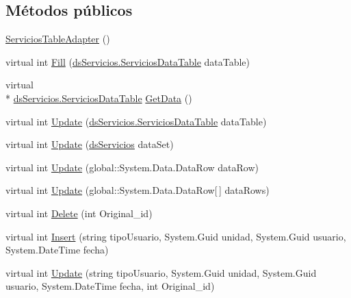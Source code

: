 \subsection*{Métodos públicos}
\begin{DoxyCompactItemize}
\item 
\hyperlink{class_proyecto___integrador__3_1_1ds_servicios_table_adapters_1_1_servicios_table_adapter_a16021c2eb24e9ee91eafb521a4d320b4}{Servicios\-Table\-Adapter} ()
\item 
virtual int \hyperlink{class_proyecto___integrador__3_1_1ds_servicios_table_adapters_1_1_servicios_table_adapter_ad0a281269dec2ad3d264f15b83b4fedf}{Fill} (\hyperlink{class_proyecto___integrador__3_1_1ds_servicios_1_1_servicios_data_table}{ds\-Servicios.\-Servicios\-Data\-Table} data\-Table)
\item 
virtual \\*
\hyperlink{class_proyecto___integrador__3_1_1ds_servicios_1_1_servicios_data_table}{ds\-Servicios.\-Servicios\-Data\-Table} \hyperlink{class_proyecto___integrador__3_1_1ds_servicios_table_adapters_1_1_servicios_table_adapter_a094ae05881b4c854d8eded668faae6c3}{Get\-Data} ()
\item 
virtual int \hyperlink{class_proyecto___integrador__3_1_1ds_servicios_table_adapters_1_1_servicios_table_adapter_aeef3160a3e0bdc86f499f0f9ad7221fd}{Update} (\hyperlink{class_proyecto___integrador__3_1_1ds_servicios_1_1_servicios_data_table}{ds\-Servicios.\-Servicios\-Data\-Table} data\-Table)
\item 
virtual int \hyperlink{class_proyecto___integrador__3_1_1ds_servicios_table_adapters_1_1_servicios_table_adapter_a3492851ad51e84e611ed56f599c8ed96}{Update} (\hyperlink{class_proyecto___integrador__3_1_1ds_servicios}{ds\-Servicios} data\-Set)
\item 
virtual int \hyperlink{class_proyecto___integrador__3_1_1ds_servicios_table_adapters_1_1_servicios_table_adapter_a029fffb4deea6ce4379d7858bc1a707c}{Update} (global\-::\-System.\-Data.\-Data\-Row data\-Row)
\item 
virtual int \hyperlink{class_proyecto___integrador__3_1_1ds_servicios_table_adapters_1_1_servicios_table_adapter_a4f3888665a7a03b764670069a0e923dd}{Update} (global\-::\-System.\-Data.\-Data\-Row\mbox{[}$\,$\mbox{]} data\-Rows)
\item 
virtual int \hyperlink{class_proyecto___integrador__3_1_1ds_servicios_table_adapters_1_1_servicios_table_adapter_ade09fa224ce227b1bd8132d103abb9bd}{Delete} (int Original\-\_\-id)
\item 
virtual int \hyperlink{class_proyecto___integrador__3_1_1ds_servicios_table_adapters_1_1_servicios_table_adapter_a8fdcc35bf82db2d196e665f73000ac0c}{Insert} (string tipo\-Usuario, System.\-Guid unidad, System.\-Guid usuario, System.\-Date\-Time fecha)
\item 
virtual int \hyperlink{class_proyecto___integrador__3_1_1ds_servicios_table_adapters_1_1_servicios_table_adapter_a5024e7973f369f5c0e4a3478f2660a75}{Update} (string tipo\-Usuario, System.\-Guid unidad, System.\-Guid usuario, System.\-Date\-Time fecha, int Original\-\_\-id)
\end{DoxyCompactItemize}
